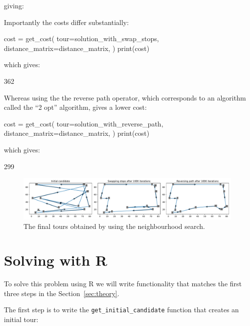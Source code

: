 giving:

\begin{pyout}
[0, 8, 5, 3, 1, 9, 12, 11, 4, 10, 6, 2, 7, 0]
\end{pyout}

Importantly the costs differ substantially:

\begin{pyin}
cost = get_cost(
    tour=solution_with_swap_stops,
    distance_matrix=distance_matrix,
)
print(cost)
\end{pyin}

which gives:

\begin{pyout}
362
\end{pyout}

Whereas using the the reverse path operator, which corresponds to an algorithm
called the ``2 opt'' algorithm, gives a lower cost:

\begin{pyin}
cost = get_cost(
    tour=solution_with_reverse_path,
    distance_matrix=distance_matrix,
)
print(cost)
\end{pyin}

which gives:

\begin{pyout}
299
\end{pyout}

\begin{figure}
    \begin{center}
        \includegraphics[width=\textwidth]{./assets/final-tsp-tours-with-python/main.pdf}
    \end{center}
    \caption{The final tours obtained by using the neighbourhood search.}
    \label{fig:final-tsp-tours}
\end{figure}

\section{Solving with R}\label{sec:solving-with-R}

To solve this problem using R we will write functionality that matches the
first three steps in the Section~\ref{sec:theory}.

The first step is to write the \texttt{get_initial_candidate}
function that creates an initial tour:

